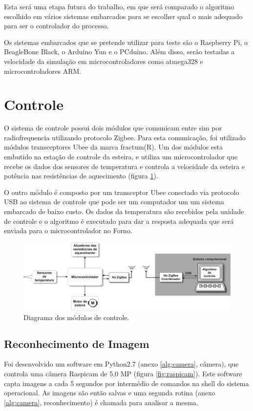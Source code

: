 Esta será uma etapa futura do trabalho, em que será comparado o algoritmo escolhido em vários sistemas embarcados para se escolher qual o mais adequado para ser o controlador do processo.

Os sistemas embarcados que se pretende utilizar para teste são o Raspberry Pi, o BeagleBone Black, o Arduino Yun e o PCduino. Além disso, serão testadas a velocidade da simulação em microcontroladores como atmega328 e microcontroladores ARM.
 

\section{Controle}

O sistema de controle possui dois módulos que comunicam entre sim por radiofrequencia utilizando protocolo Zigbee. Para esta comunicação, foi utilizado módulos transceptores Ubee da marca fractum(R). Um dos módulos esta embutido na estação de controle da esteira, e utiliza um microcontrolador que recebe os dados dos sensores de temperatura e controla a velocidade da esteira e potência nas resistências de aquecimento (figura \ref{fig:controle_forno}). 

O outro módulo é composto por um transceptor Ubee conectado via protocolo USB ao sistema de controle que pode ser um computador um um sistema embarcado de baixo custo. Os dados da temperatura são recebidos pela unidade de controle e o algoritmo é executado para dar a resposta adequada que será enviada para o microcontrolador no Forno.
 
\begin{figure}[H]
\centering
\includegraphics[width=\textwidth]{Figuras/controle_forno}
\caption{Diagrama dos módulos de controle.}
\label{fig:controle_forno}
\end{figure}
 
\subsection{Reconhecimento de Imagem}
 
Foi desenvolvido um software em Python2.7 (anexo \ref{alg:camera}, câmera), que controla uma câmera Raspicam de 5.0 MP (figura \ref{fig:raspicam}). Este software capta imagens a cada 5 segundos por intermédio de comandos na shell do sistema operacional. As imagens são então salvas e uma segunda rotina (anexo \ref{alg:camera}, reconhecimento) é chamada para analisar a mesma.

